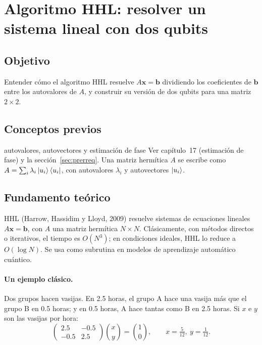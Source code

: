 \def\tituloconcepto{Algoritmo HHL}


\section{Algoritmo HHL: resolver un sistema lineal con dos qubits}

\subsection{Objetivo}
Entender cómo el algoritmo HHL resuelve $A\mathbf x=\mathbf b$ dividiendo los
coeficientes de $\mathbf b$ entre los autovalores de $A$, y construir su versión
de dos qubits para una matriz $2\times2$.

\subsection{Conceptos previos}
\begin{concepto}{autovalores, autovectores y estimación de fase}
Ver capítulo~17 (estimación de fase) y la sección~\ref{sec:prerreq}. Una matriz
hermítica $A$ se escribe como $A=\sum_i\lambda_i\left|u_i\right\rangle\left\langle u_i\right|$, con
autovalores $\lambda_i$ y autovectores $\left|u_i\right\rangle$.
\end{concepto}

\subsection{Fundamento teórico}
HHL (Harrow, Hassidim y Lloyd, 2009) resuelve sistemas de ecuaciones lineales
$A\mathbf x=\mathbf b$, con $A$ una matriz hermítica $N\times N$. Clásicamente, con
métodos directos o iterativos, el tiempo es $O(N^3)$; en condiciones ideales,
HHL lo reduce a $O(\log N)$. Se usa como subrutina en modelos de aprendizaje
automático cuántico.

\paragraph{Un ejemplo clásico.} Dos grupos hacen vasijas. En 2.5 horas, el grupo
A hace una vasija más que el grupo B en 0.5 horas; y en 0.5 horas, A hace tantas
como B en 2.5 horas. Si $x$ e $y$ son las vasijas por hora:
\begin{equation}
  \begin{pmatrix}2.5&-0.5\\-0.5&2.5\end{pmatrix}
  \binom xy=\binom10 ,\qquad x=\tfrac5{12},\ y=\tfrac1{12}.
\end{equation}

